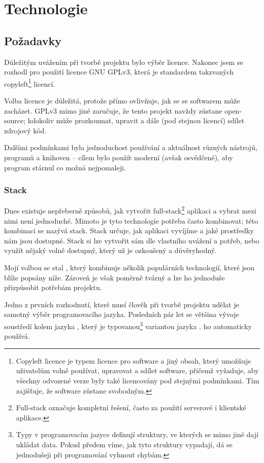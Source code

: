 \hypertarget{Technologie}{\chapter{Technologie}}

\section{Požadavky}

Důležitým uvážením při tvorbě projektu bylo výběr licence. Nakonec jsem se rozhodl pro použití licence GNU GPLv3, která je standardem takzvaných copyleft\footnote{Copyleft licence je typem licence pro software a jiný obsah, který umožňuje uživatelům volně používat, upravovat a sdílet software, přičemž vyžaduje, aby všechny odvozené verze byly také licencovány pod stejnými podmínkami. Tím zajišťuje, že software zůstane svobodným.} licencí.

Volba licence je důležitá, protože přímo ovlivňuje, jak se se softwarem může zacházet. GPLv3 mimo jiné zaručuje, že tento projekt navždy zůstane open-source; kdokoliv může prozkoumat, upravit a dále (pod stejnou licencí) sdílet zdrojový kód.\cite{choosealicense}

Dalšími podmínkami byla jednoduchost používání a aktuálnost různých nástrojů, programů a knihoven -- cílem bylo použít moderní (avšak osvědčené), aby program stárnul co možná nejpomaleji.

\subsection{Stack}

Dnes existuje nepřeberně způsobů, jak vytvořit full-stack\footnote{Full-stack označuje kompletní řešení, často za použití serverové i klientské aplikace.} aplikaci a vybrat mezi nimi není jednoduché. Mimoto je tyto technologie potřeba často kombinovat; této kombinaci se nazývá stack. Stack určuje, jak aplikaci vyvíjíme a jaké prostředky nám jsou dostupné. Stack si lze vytvořit sám dle vlastního uvážení a potřeb, nebo využít nějaký volně dostupný, který už je ozkoušený a důvěryhodný.

Mojí volbou se stal , který kombinuje několik populárních technologií, které jsou blíže popsány níže. Zároveň je však poměrně tvárný a lze ho jednoduše přizpůsobit potřebám projektu.\cite{t3stack}

Jedno z prvních rozhodnutí, které musí člověk při tvorbě projektu udělat je samotný výběr programovacího jazyka. Posledních pár let se většina vývoje soustředí kolem jazyka , který je typovanou\footnote{Typy v programovacím jazyce definují struktury, ve kterých se mimo jiné dají ukládat data. Pokud předem víme, jak tyto struktury vypadají, dá se jednodušeji při programování vyhnout chybám.} variantou jazyka .  ho automaticky používá. 

